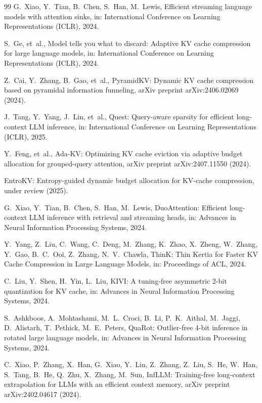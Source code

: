 \documentclass[final,5p,times,twocolumn]{elsarticle}
\theoremstyle{definition}
\theoremstyle{remark}
\begin{document}
\begin{thebibliography}{99}
G.~Xiao, Y.~Tian, B.~Chen, S.~Han, M.~Lewis,
Efficient streaming language models with attention sinks,
in: International Conference on Learning Representations (ICLR), 2024.

S.~Ge, et~al.,
Model tells you what to discard: Adaptive KV cache compression for
large language models,
in: International Conference on Learning Representations (ICLR), 2024.

Z.~Cai, Y.~Zhang, B.~Gao, et~al.,
PyramidKV: Dynamic KV cache compression based on pyramidal information
funneling,
arXiv preprint arXiv:2406.02069 (2024).

J.~Tang, Y.~Yang, J.~Lin, et~al.,
Quest: Query-aware sparsity for efficient long-context LLM inference,
in: International Conference on Learning Representations (ICLR), 2025.

Y.~Feng, et~al.,
Ada-KV: Optimizing KV cache eviction via adaptive budget allocation
for grouped-query attention,
arXiv preprint arXiv:2407.11550 (2024).

EntroKV: Entropy-guided dynamic budget allocation for KV-cache
compression,
under review (2025).

G.~Xiao, Y.~Tian, B.~Chen, S.~Han, M.~Lewis,
DuoAttention: Efficient long-context LLM inference with retrieval and
streaming heads,
in: Advances in Neural Information Processing Systems, 2024.

Y.~Yang, Z.~Liu, C.~Wang, C.~Deng, M.~Zhang, K.~Zhao, X.~Zheng,
W.~Zhang, Y.~Gao, B.~C.~Ooi, Z.~Zhang, N.~V.~Chawla,
ThinK: Thin Kertia for Faster KV Cache Compression in Large Language
Models,
in: Proceedings of ACL, 2024.

C.~Liu, Y.~Shen, H.~Yin, L.~Liu,
KIVI: A tuning-free asymmetric 2-bit quantization for KV cache,
in: Advances in Neural Information Processing Systems, 2024.

S.~Ashkboos, A.~Mohtashami, M.~L.~Croci, B.~Li, P.~K.~Aithal,
M.~Jaggi, D.~Alistarh, T.~Pethick, M.~E.~Peters,
QuaRot: Outlier-free 4-bit inference in rotated large language models,
in: Advances in Neural Information Processing Systems, 2024.

C.~Xiao, P.~Zhang, X.~Han, G.~Xiao, Y.~Lin, Z.~Zhang, Z.~Liu,
S.~He, W.~Han, S.~Tang, B.~He, Q.~Zhu, X.~Zhang, M.~Sun,
InfLLM: Training-free long-context extrapolation for LLMs with an
efficient context memory,
arXiv preprint arXiv:2402.04617 (2024).


\end{thebibliography}
\end{document}
